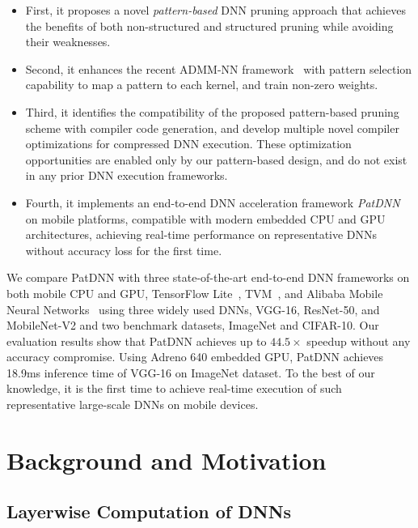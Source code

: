 \documentclass[sigplan,screen]{acmart}
\begin{document}
\begin{itemize}\item First, it proposes a novel {\em pattern-based} DNN pruning approach that achieves the benefits of both non-structured and structured pruning while avoiding their weaknesses.


    \item Second, it enhances the recent ADMM-NN framework~\cite{ren2019ADMMNN,ye2019progressive} with pattern selection capability to map a pattern to each kernel, and train non-zero weights.


    \item Third, it identifies the compatibility of the proposed pattern-based pruning scheme with compiler code generation, and develop multiple novel compiler optimizations for compressed DNN execution. These optimization opportunities are enabled only by our pattern-based design, and do not exist in any prior DNN execution frameworks.


    \item Fourth, it implements an end-to-end DNN acceleration framework {\em PatDNN} on mobile platforms, compatible with modern embedded CPU and GPU architectures, achieving real-time performance on representative DNNs without accuracy loss for the first time.
\end{itemize}

We compare PatDNN with three state-of-the-art end-to-end DNN frameworks on both mobile CPU and GPU, TensorFlow Lite~\cite{TensorFlow-Lite}, TVM~\cite{chen2018tvm}, and Alibaba Mobile Neural Networks~\cite{Ali-MNN} using three widely used DNNs, VGG-16, ResNet-50, and MobileNet-V2 and two benchmark datasets, ImageNet and CIFAR-10. Our evaluation results show that PatDNN achieves up to $44.5\times$ speedup without any accuracy compromise. Using Adreno 640 embedded GPU, PatDNN achieves 18.9ms inference time of VGG-16 on ImageNet dataset. To the best of our knowledge, it is the first time to achieve real-time execution of such representative large-scale DNNs on mobile devices.











%
 \section{Background and Motivation}

\subsection{Layerwise Computation of DNNs}
\end{document}
